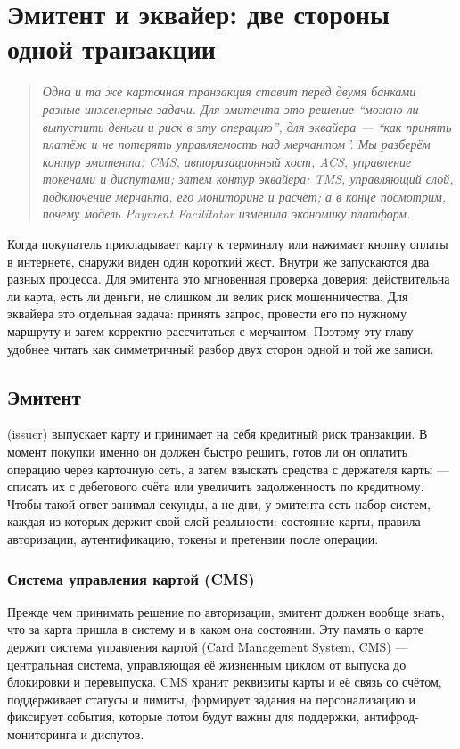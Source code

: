 
\chapter{Эмитент и эквайер: две стороны одной транзакции}
\label{ch:issuer-acquirer}
\begin{quote}
  \itshape
  Одна и та же карточная транзакция ставит перед двумя банками
  разные инженерные задачи. Для эмитента это решение
  \enquote{можно ли выпустить деньги и риск в эту операцию},
  для эквайера --- \enquote{как принять платёж и не потерять
  управляемость над мерчантом}. Мы разберём контур эмитента:
  CMS, авторизационный хост, ACS, управление токенами и диспутами;
  затем контур эквайера: TMS, управляющий слой, подключение
  мерчанта, его мониторинг и расчёт; а в конце посмотрим,
  почему модель Payment Facilitator изменила экономику платформ.
\end{quote}

Когда покупатель прикладывает карту к терминалу или нажимает
кнопку оплаты в интернете, снаружи виден один короткий жест.
Внутри же запускаются два разных процесса. Для эмитента это
мгновенная проверка доверия: действительна ли карта, есть ли деньги,
не слишком ли велик риск мошенничества. Для эквайера это
отдельная задача: принять запрос, провести его по нужному
маршруту и затем корректно рассчитаться с мерчантом. Поэтому
эту главу удобнее читать как симметричный разбор двух сторон
одной и той же записи.

\section{Эмитент}
\label{sec:ia-issuer}

 (issuer) выпускает карту и принимает на себя кредитный
риск транзакции. В момент покупки именно он должен быстро решить,
готов ли он оплатить операцию через карточную сеть, а затем
взыскать средства с держателя карты --- списать их с дебетового
счёта или увеличить задолженность по кредитному. Чтобы такой ответ
занимал секунды, а не дни, у эмитента есть набор систем, каждая
из которых держит свой слой реальности: состояние карты, правила
авторизации, аутентификацию, токены и претензии после операции.

\subsection*{Система управления картой (CMS)}

Прежде чем принимать решение по авторизации, эмитент должен
вообще знать, что за карта пришла в систему и в каком она
состоянии. Эту память о карте держит система управления картой
(Card Management System, CMS) --- центральная система, управляющая её жизненным циклом
от выпуска до блокировки и перевыпуска. CMS хранит реквизиты
карты и её связь со счётом, поддерживает статусы и лимиты,
формирует задания на персонализацию и фиксирует события,
которые потом будут важны для поддержки, антифрод-мониторинга
и диспутов.

